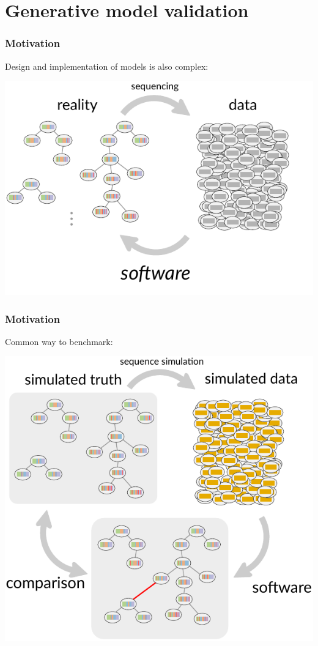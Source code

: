 \documentclass[mathserif,compress]{beamer}
\renewcommand\;{\,}
\begin{document}
\section{Generative model validation}

\begin{frame}\frametitle{Motivation}
Design and implementation of models is also complex:
\begin{center}
\includegraphics[width=0.8 \linewidth]{Images/bcell-mess-software.pdf}
\end{center}
\end{frame}

\begin{frame}\frametitle{Motivation}
Common way to benchmark: 
\begin{center}
\includegraphics[width=0.7\linewidth]{Images/bcell-mess-simulation.pdf}
\end{center}
\end{frame}
\end{document}
